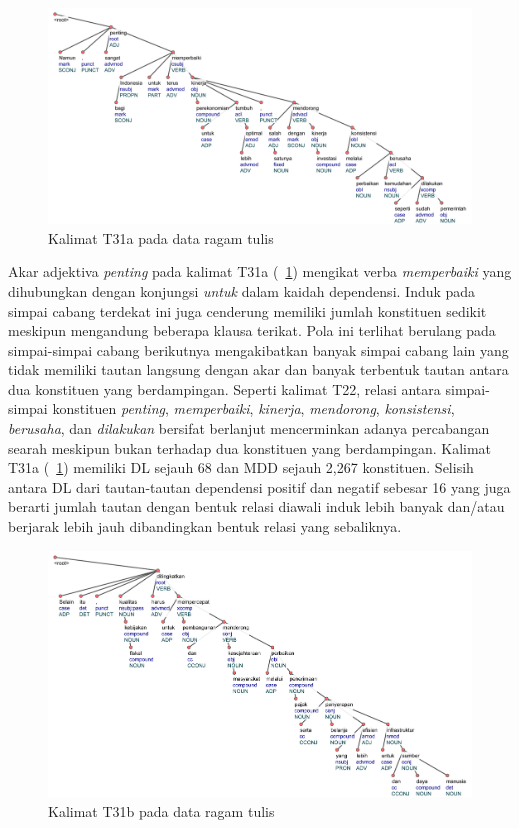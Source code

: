 \begin{figure}
	\centering \includegraphics[width=1
	\textwidth] {pics/ts2079.jpg} 
	\caption{Kalimat T31a pada data ragam tulis} 
	\label{fig:ts2079} 
\end{figure}

Akar adjektiva \textit{penting} pada kalimat T31a (\pic~\ref{fig:ts2079}) mengikat verba \textit{memperbaiki} yang dihubungkan dengan konjungsi \textit{untuk} dalam kaidah dependensi. Induk pada simpai cabang terdekat ini juga cenderung memiliki jumlah konstituen sedikit meskipun mengandung beberapa klausa terikat. Pola ini terlihat berulang pada simpai-simpai cabang berikutnya mengakibatkan banyak simpai cabang lain yang tidak memiliki tautan langsung dengan akar dan banyak terbentuk tautan antara dua konstituen yang berdampingan. Seperti kalimat T22, relasi antara simpai-simpai konstituen \textit{penting}, \textit{memperbaiki}, \textit{kinerja}, \textit{mendorong}, \textit{konsistensi}, \textit{berusaha}, dan \textit{dilakukan} bersifat berlanjut mencerminkan adanya percabangan searah meskipun bukan terhadap dua konstituen yang berdampingan. Kalimat T31a (\pic~\ref{fig:ts2079}) memiliki DL sejauh 68 dan MDD sejauh 2,267 konstituen. Selisih antara DL dari tautan-tautan dependensi positif dan negatif sebesar 16 yang juga berarti jumlah tautan dengan bentuk relasi diawali induk lebih banyak dan/atau berjarak lebih jauh dibandingkan bentuk relasi yang sebaliknya.

\begin{figure}
	\centering \includegraphics[width=1
	\textwidth] {pics/ts2081.jpg} 
	\caption{Kalimat T31b pada data ragam tulis} 
	\label{fig:ts2081} 
\end{figure}

